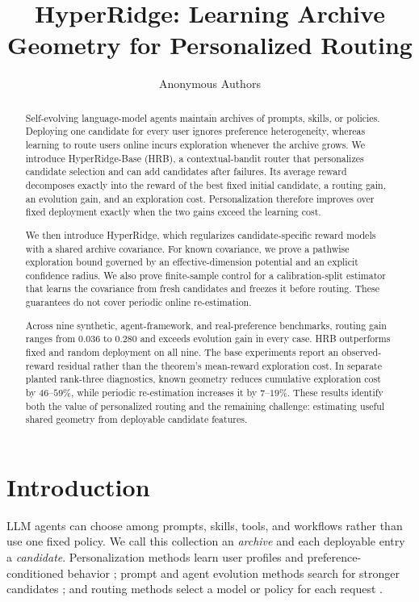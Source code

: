 \documentclass{article} %
\title{HyperRidge: Learning Archive Geometry for Personalized Routing}
\author{Anonymous Authors}
\begin{document}
\allowdisplaybreaks[3]

\maketitle

\begin{abstract}
Self-evolving language-model agents maintain archives of prompts, skills, or
policies. Deploying one candidate for every user ignores preference
heterogeneity, whereas learning to route users online incurs exploration
whenever the archive grows. We introduce HyperRidge-Base (HRB), a contextual-bandit
router that personalizes candidate selection and can add candidates after
failures. Its average reward decomposes exactly into the reward of the best
fixed initial candidate, a routing gain, an evolution gain, and an exploration
cost. Personalization therefore improves over fixed deployment exactly when
the two gains exceed the learning cost.

We then introduce HyperRidge, which regularizes
candidate-specific reward models with a shared archive covariance. For known
covariance, we prove a pathwise exploration bound governed by an
effective-dimension potential and an explicit confidence radius. We also prove
finite-sample control for a calibration-split estimator that learns the
covariance from fresh candidates and freezes it before routing. These
guarantees do not cover periodic online re-estimation.

Across nine synthetic, agent-framework, and real-preference benchmarks,
routing gain ranges from $0.036$ to $0.280$ and exceeds evolution gain in every
case. HRB outperforms fixed and random deployment on all nine. The
base experiments report an observed-reward residual rather than the theorem's
mean-reward exploration cost. In separate planted rank-three diagnostics,
known geometry reduces cumulative exploration cost by $46$--$59\%$, while
periodic re-estimation increases it by $7$--$19\%$. These results identify both
the value of personalized routing and the remaining challenge: estimating
useful shared geometry from deployable candidate features.
\end{abstract}

\section{Introduction}

\label{sec:intro}

LLM agents can choose among prompts, skills, tools, and workflows rather than use one fixed policy. We call this collection an \emph{archive} and each deployable entry a \emph{candidate}. Personalization methods learn user profiles and preference-conditioned behavior \citep{salemi2023lamp,zhao2025prefeval,jin2026personalizing}; prompt and agent evolution methods search for stronger candidates \citep{fernando2023promptbreeder,guo2024evoprompt,zhou2024symbolic,agrawal2025geparp}; and routing methods select a model or policy for each request \citep{ong2024routellm,hu2024routerbench,li2025llmbandit,tsai2026neuralucb}.
\end{document}
